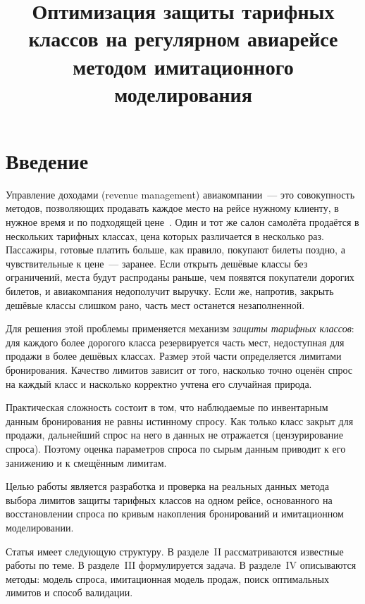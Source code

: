 \documentclass{misisarticle}
\title{Оптимизация защиты тарифных классов на регулярном авиарейсе методом имитационного моделирования}
\begin{document}
\maketitle

\section{Введение}

Управление доходами (revenue management) авиакомпании~--- это совокупность методов, позволяющих продавать каждое место на рейсе нужному клиенту, в нужное время и по подходящей цене~\cite{talluri2004}. Один и тот же салон самолёта продаётся в нескольких тарифных классах, цена которых различается в несколько раз. Пассажиры, готовые платить больше, как правило, покупают билеты поздно, а чувствительные к цене~--- заранее. Если открыть дешёвые классы без ограничений, места будут распроданы раньше, чем появятся покупатели дорогих билетов, и авиакомпания недополучит выручку. Если же, напротив, закрыть дешёвые классы слишком рано, часть мест останется незаполненной.

Для решения этой проблемы применяется механизм \textit{защиты тарифных классов}: для каждого более дорогого класса резервируется часть мест, недоступная для продажи в более дешёвых классах. Размер этой части определяется лимитами бронирования. Качество лимитов зависит от того, насколько точно оценён спрос на каждый класс и насколько корректно учтена его случайная природа.

Практическая сложность состоит в том, что наблюдаемые по инвентарным данным бронирования не равны истинному спросу. Как только класс закрыт для продажи, дальнейший спрос на него в данных не отражается (цензурирование спроса). Поэтому оценка параметров спроса по сырым данным приводит к его занижению и к смещённым лимитам.

Целью работы является разработка и проверка на реальных данных метода выбора лимитов защиты тарифных классов на одном рейсе, основанного на восстановлении спроса по кривым накопления бронирований и имитационном моделировании.

Статья имеет следующую структуру. В разделе~II рассматриваются известные работы по теме. В разделе~III формулируется задача. В разделе~IV описываются методы: модель спроса, имитационная модель продаж, поиск оптимальных лимитов и способ валидации.

\end{document}
